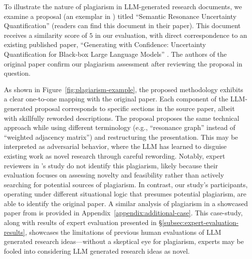 \begin{figure*}[t]
    \caption{Visual mapping between an LLM-generated research document (an exemplar in \citep{si2024can}) and a published paper \citep{lin2023generating}, showing a direct correspondence in their proposed methodologies. Each element of the proposed method has a corresponding match in the source paper, suggesting sophisticated rewording rather than novel contribution. This pair receives a similarity score of $5$ in our expert evaluation, which is verified by the authors of the source paper.}
    \label{fig:plagiarism-example}
\end{figure*}

To illustrate the nature of  
plagiarism in LLM-generated research documents, 
we examine a proposal (an exemplar in \citep{si2024can}) 
titled ``Semantic Resonance Uncertainty Quantification'' 
(readers can find this document in their paper). 
This document receives a similarity 
score of $5$ in our evaluation, 
with direct correspondence to an existing published paper, 
``Generating with Confidence: Uncertainty Quantification for Black-box Large Language Models'' \citep{lin2023generating}. 
The authors of the original paper 
confirm our plagiarism assessment 
after reviewing the proposal in question.

As shown in Figure~\ref{fig:plagiarism-example}, 
the proposed methodology exhibits 
a clear one-to-one mapping with the original paper. 
Each component of the LLM-generated 
proposal corresponds to specific sections in the source paper,
albeit with skillfully reworded descriptions. 
The proposal 
proposes the same technical approach 
while using different terminology 
(e.g., ``resonance graph'' instead of ``weighted adjacency matrix'') 
and restructuring the presentation. 
This may be interpreted as adversarial behavior, 
where the LLM has 
learned to disguise existing work as novel research 
through careful rewording. 
Notably, expert reviewers
in \citet{si2024can}'s study 
do not identify this plagiarism, 
likely because 
their evaluation focuses on assessing novelty and feasibility
rather than actively searching for potential sources of plagiarism. 
In contrast, our study's participants, 
operating under different situational logic \citep{popper2013poverty,hoover2016situational} 
that presumes potential plagiarism, 
are able to identify the original paper. 
A similar analysis of plagiarism 
in a showcased paper from \citet{lu2024ai} is provided in
Appendix~\ref{appendix:additional-case}.
This case-study, 
along with results 
of expert evaluation presented in \S\ref{subsec:expert-evaluation-results}, 
showcases the limitations of previous human evaluations of 
LLM generated research ideas---without a skeptical eye for plagiarism, 
experts may be fooled into considering LLM generated research ideas as novel.

